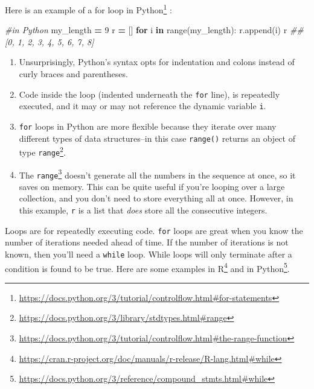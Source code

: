 \documentclass[12pt,krantz2]{krantz}
\makeatletter
\newenvironment{Shaded}{\begin{snugshade}}{\end{snugshade}}
\newcommand{\BuiltInTok}[1]{#1}
\newcommand{\CommentTok}[1]{\textcolor[rgb]{0.37,0.37,0.37}{\textit{#1}}}
\newcommand{\ControlFlowTok}[1]{\textcolor[rgb]{0.27,0.27,0.27}{\textbf{#1}}}
\newcommand{\DecValTok}[1]{\textcolor[rgb]{0.06,0.06,0.06}{#1}}
\newcommand{\KeywordTok}[1]{\textcolor[rgb]{0.27,0.27,0.27}{\textbf{#1}}}
\newcommand{\NormalTok}[1]{#1}
\newcommand{\OperatorTok}[1]{\textcolor[rgb]{0.43,0.43,0.43}{\textbf{#1}}}
\providecommand{\tightlist}{%
  \setlength{\itemsep}{0pt}\setlength{\parskip}{0pt}}
\renewcommand{\href}[2]{#2\footnote{\url{#1}}}
\newenvironment{kframe}{%
\medskip{}
\setlength{\fboxsep}{.8em}
 \def\at@end@of@kframe{}%
 \ifinner\ifhmode%
  \def\at@end@of@kframe{\end{minipage}}%
  \begin{minipage}{\columnwidth}%
 \fi\fi%
 \def\FrameCommand##1{\hskip\@totalleftmargin \hskip-\fboxsep
 \colorbox{shadecolor}{##1}\hskip-\fboxsep
     \hskip-\linewidth \hskip-\@totalleftmargin \hskip\columnwidth}%
 \MakeFramed {\advance\hsize-\width
   \@totalleftmargin\z@ \linewidth\hsize
   \@setminipage}}%
 {\par\unskip\endMakeFramed%
 \at@end@of@kframe}
\renewenvironment{Shaded}{\begin{kframe}}{\end{kframe}}
\makeatother
\begin{document}
\href{https://docs.python.org/3/tutorial/controlflow.html\#for-statements}{Here is an example of a for loop in Python} \citep{Lutz13}:

\begin{Shaded}
\begin{Highlighting}[]
\CommentTok{#in Python}
\NormalTok{my_length }\OperatorTok{=} \DecValTok{9}
\NormalTok{r }\OperatorTok{=}\NormalTok{ []}
\ControlFlowTok{for}\NormalTok{ i }\KeywordTok{in} \BuiltInTok{range}\NormalTok{(my_length):}
\NormalTok{  r.append(i)}
\NormalTok{r}
\CommentTok{## [0, 1, 2, 3, 4, 5, 6, 7, 8]}
\end{Highlighting}
\end{Shaded}

\begin{enumerate}
\def\labelenumi{\arabic{enumi}.}
\tightlist
\item
  Unsurprisingly, Python's syntax opts for indentation and colons instead of curly braces and parentheses.
\item
  Code inside the loop (indented underneath the \texttt{for} line), is repeatedly executed, and it may or may not reference the dynamic variable \texttt{i}.
\item
  \texttt{for} loops in Python are more flexible because they iterate over many different types of data structures--in this case \href{https://docs.python.org/3/library/stdtypes.html\#range}{\texttt{range()} returns an object of type \texttt{range}}.
\item
  The \href{https://docs.python.org/3/tutorial/controlflow.html\#the-range-function}{\texttt{range}} doesn't generate all the numbers in the sequence at once, so it saves on memory. This can be quite useful if you're looping over a large collection, and you don't need to store everything all at once. However, in this example, \texttt{r} is a list that \emph{does} store all the consecutive integers.
\end{enumerate}

Loops are for repeatedly executing code. \texttt{for} loops are great when you know the number of iterations needed ahead of time. If the number of iterations is not known, then you'll need a \texttt{while} loop. While loops will only terminate after a condition is found to be true. Here are some examples \href{https://cran.r-project.org/doc/manuals/r-release/R-lang.html\#while}{in R} and \href{https://docs.python.org/3/reference/compound_stmts.html\#while}{in Python}.
\end{document}
